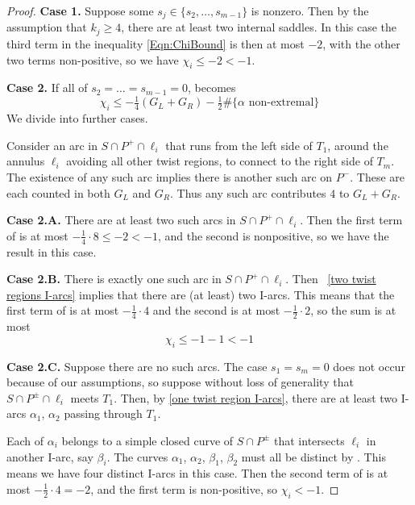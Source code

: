 \documentclass[12pt,reqno]{amsart}
\theoremstyle{plain}
\theoremstyle{definition}
\begin{document}
\begin{proof}
\textbf{Case 1.} Suppose some $s_j \in \{s_2, \dots, s_{m-1}\}$ is nonzero. Then by the 
assumption that $k_j\geq 4$, there are at least two internal saddles. In this case the 
third term in the inequality \eqref{Eqn:ChiBound} is then at most $-2$, with the other 
two terms non-positive, so we have $\chi_i \leq -2 < -1$. 

\textbf{Case 2.} If all of $s_2= \dots = s_{m-1} =0$,  becomes
\begin{equation}\label{Eqn:ChiBound2}
\chi_i \leq -\tfrac14 (G_L+G_R) - \tfrac12\#\{\alpha\text{ non-extremal}\}
\end{equation}
We divide into further cases.

Consider an arc in $S\cap P^+\cap \ell_i$ that runs from the left side of $T_1$, around 
the annulus $\ell_i$ avoiding all other twist regions, to connect to the right side of $T_m$. 
The existence of any such arc implies there is another such arc on $P^-$. These are each 
counted in both $G_L$ and $G_R$. Thus any such arc contributes $4$ to $G_L+G_R$.  
    
\textbf{Case 2.A.} There are at least two such arcs in $S\cap P^+\cap \ell_i$. 
Then the first term of  is at most $-\tfrac14\cdot 8 \leq -2 < -1$, 
and the second is nonpositive, so we have the result in this case. 

\textbf{Case 2.B.} There is exactly one such arc in $S\cap P^+\cap \ell_i$. Then 
~\ref{two twist regions I-arcs} implies that there are (at least) 
two I-arcs. This means that the first term of  is at most 
$-\tfrac14\cdot 4$ and the second is at most $-\tfrac12 \cdot 2$, so the sum is at most
\[ \chi_i \leq -1 - 1 < -1 \]

\textbf{Case 2.C.}
Suppose there are no such arcs. The case $s_1=s_m=0$ does not occur because of our 
assumptions, so suppose without loss of generality that $S\cap P^\pm \cap \ell_i$ 
meets $T_1$. Then, by  \ref{one twist region I-arcs}, there 
are at least two I-arcs $\alpha_1$, $\alpha_2$ passing through $T_1$.

Each of $\alpha_i$ belongs to a simple closed curve of $S\cap P^\pm$ that intersects 
$\ell_i$ in another I-arc, say $\beta_i$. The curves $\alpha_1$, $\alpha_2$, $\beta_1$,
$\beta_2$ must all be distinct by . This means we have four 
distinct I-arcs in this case. 
Then the second term of  is at most $-\tfrac12 \cdot 4 = -2$, and 
the first term is non-positive, so $\chi_i < -1$. 
\end{proof}
\end{document}
